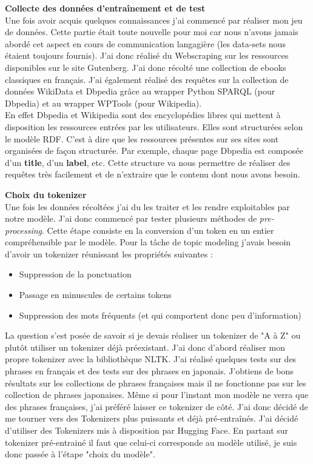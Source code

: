 \documentclass[12pt]{article}
\begin{document}
\textbf{Collecte des données d'entraînement et de test} \\
Une fois avoir acquis quelques connaissances j'ai commencé par réaliser mon jeu de données. Cette partie était toute nouvelle pour moi car nous n'avons jamais abordé cet aspect en cours de communication langagière (les data-sets nous étaient toujours fournis). J'ai donc réalisé du Webscraping sur les ressources disponibles sur le site Gutenberg. J'ai donc récolté une collection de ebooks classiques en français.
J'ai également réalisé des requêtes sur la collection de données WikiData et Dbpedia grâce au wrapper Python SPARQL (pour Dbpedia) et au wrapper WPTools (pour Wikipedia). \\
En effet Dbpedia et Wikipedia sont des encyclopédies libres qui mettent à disposition les ressources entrées par les utilisateurs. Elles sont structurées selon le modèle RDF. C'est à dire que les ressources présentes sur ses sites sont organisées de façon structurée. Par exemple, chaque page Dbpedia est composée d'un \textbf{title}, d'un \textbf{label}, etc. Cette structure va nous permettre de réaliser des requêtes très facilement et de n'extraire que le contenu dont nous avons besoin. \\

\clearpage

\textbf{Choix du tokenizer} \\
Une fois les données récoltées j'ai du les traiter et les rendre exploitables par notre modèle. J'ai donc commencé par tester plusieurs méthodes de \textit{pre-processing}. Cette étape consiste en la conversion d'un token en un entier compréhensible par le modèle. Pour la tâche de topic modeling j'avais besoin d'avoir un  tokenizer réunissant les propriétés suivantes :

\begin{itemize}
    \item Suppression de la ponctuation 
    \item Passage en minuscules de certains tokens 
    \item Suppression des mots fréquents (et qui comportent donc peu d'information)
\end{itemize} 


La question s'est posée de savoir si je devais réaliser un tokenizer de "A à Z" ou plutôt utiliser un tokenizer déjà préexistant. J'ai donc d'abord réaliser mon propre tokenizer avec la bibliothèque NLTK. J'ai réalisé quelques tests sur des phrases en français et des tests sur des phrases en japonais. J'obtiens de bons résultats sur les collections de phrases françaises mais il ne fonctionne pas sur les collection de phrases japonaises. Même si pour l'instant mon modèle ne verra que des phrases françaises, j'ai préféré laisser ce tokenizer de côté. 
J'ai donc décidé de me tourner vers des Tokenizers plus puissants et déjà pré-entraînés. J'ai décidé d'utiliser des Tokenizers mis à disposition par Hugging Face. En partant sur tokenizer pré-entrainé il faut que celui-ci corresponde au modèle utilisé, je suis donc passée à l'étape "choix du modèle". \\
\end{document}
